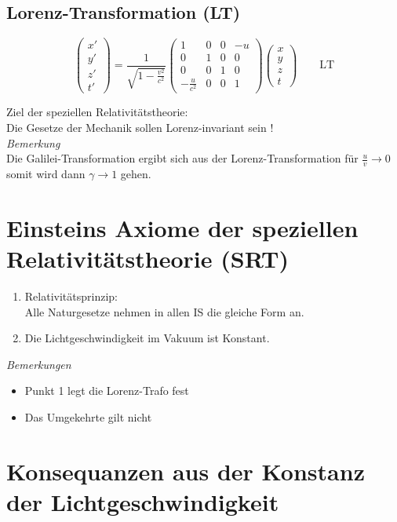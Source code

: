 \documentclass[titlepage,11pt,a4paper,ngerman]{report}
\newcommand{\tx}[1]{\textrm{#1}}
\newcommand{\frbox}[2]{\begin{tcolorbox}[colback=white,colframe=red!75!black,fonttitle=\bfseries,title=#1]#2\end{tcolorbox}}
\begin{document}
\subsection{Lorenz-Transformation (LT)}
\frbox{Lorenz-Trafo}{\begin{equation*}
\begin{pmatrix}
x' \\ y' \\ z' \\ t'
\end{pmatrix} = \frac{1}{\sqrt{1 - \frac{v^2}{c^2}}} \begin{pmatrix}
1&0&0&-u\\
0&1&0&0\\
0&0&1&0\\
-\frac{u}{c^2}&0&0&1
\end{pmatrix} \begin{pmatrix}
x\\y\\z\\t
\end{pmatrix} \qquad \tx{LT}
\end{equation*}}
Ziel der speziellen Relativitätstheorie:\\
Die Gesetze der Mechanik sollen Lorenz-invariant sein !\\[5pt]
\emph{Bemerkung}\\
Die Galilei-Transformation ergibt sich aus der Lorenz-Transformation für $ \frac{u}{v} \rightarrow 0 $ somit wird dann $ \gamma \rightarrow 1 $ gehen.

\section{Einsteins Axiome der speziellen Relativitätstheorie (SRT)}
\begin{enumerate}[1.]
	\item Relativitätsprinzip:\\
	Alle Naturgesetze nehmen in allen IS die gleiche Form an.
	\item Die Lichtgeschwindigkeit im Vakuum ist Konstant.
\end{enumerate}
\emph{Bemerkungen}
\begin{itemize}
	\item Punkt 1 legt die Lorenz-Trafo fest
	\item Das Umgekehrte gilt nicht
\end{itemize}

\section{Konsequanzen aus der Konstanz der Lichtgeschwindigkeit}
\end{document}
